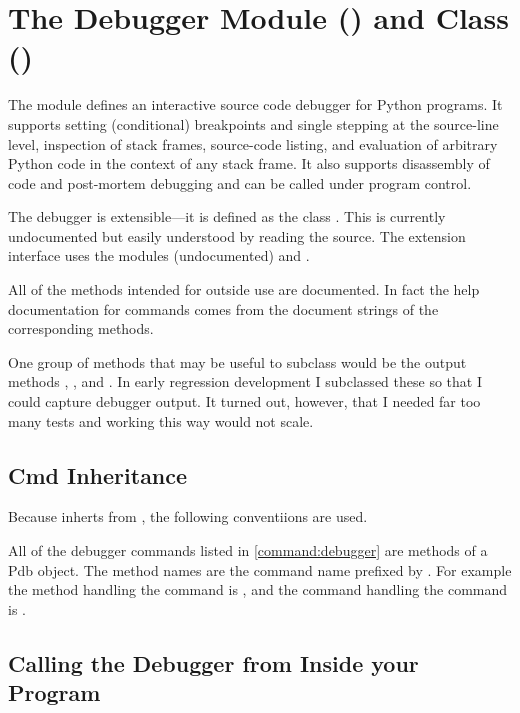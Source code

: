 \section{The Debugger Module () and Class () \label{pydb-module-class}}

The module  defines an interactive source code
debugger for Python programs.  It supports setting
(conditional) breakpoints and single stepping at the source-line
level, inspection of stack frames, source-code listing, and evaluation
of arbitrary Python code in the context of any stack frame.  It also
supports disassembly of code and post-mortem debugging and can be
called under program control.

The debugger is extensible---it is defined as the class
.  This is
currently undocumented but easily understood by reading the source.
The extension interface uses the modules
 (undocumented) and
.

All of the methods intended for outside use are documented. In fact
the help documentation for commands comes from the document strings of
the corresponding methods.

One group of methods that may be useful to subclass would be the
output methods , , and
. In early regression development I subclassed these
so that I could capture debugger output. It turned out, however, that
I needed far too many tests and working this way would not scale.

\subsection{Cmd Inheritance}
Because  inherts from , the following
conventiions are used. 

All of the debugger commands listed in \ref{command:debugger} are methods
of a Pdb object. The method names are the command name prefixed by
. For example the method handling the  command is
, and the command handling the  command is
. 


\subsection{Calling the Debugger from Inside your Program}\label{subsection-calling-pydb-inside-program}

